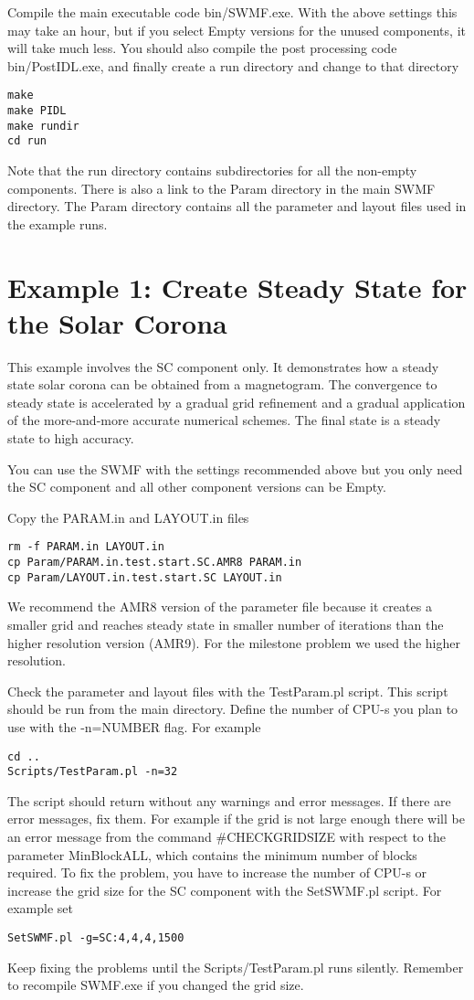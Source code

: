 Compile the main executable code bin/SWMF.exe. With the above
settings this may take an hour, but if you select Empty versions
for the unused components, it will take much less.
You should also compile the post processing code bin/PostIDL.exe,
and finally create a run directory and change to that directory
\begin{verbatim}
make
make PIDL
make rundir
cd run
\end{verbatim}
Note that the run directory contains subdirectories for all the
non-empty components. There is also a link to the Param directory
in the main SWMF directory. The Param directory contains all the
parameter and layout files used in the example runs.

\section{Example 1: Create Steady State for the Solar Corona}

This example involves the SC component only. It demonstrates
how a steady state solar corona can be obtained from
a magnetogram. The convergence to steady state is accelerated by 
a gradual grid refinement and a gradual application of the
more-and-more accurate numerical schemes. The final state
is a steady state to high accuracy. 

You can use the SWMF with the settings recommended above
but you only need the SC component and
all other component versions can be Empty.

Copy the PARAM.in and LAYOUT.in files
\begin{verbatim}
rm -f PARAM.in LAYOUT.in
cp Param/PARAM.in.test.start.SC.AMR8 PARAM.in
cp Param/LAYOUT.in.test.start.SC LAYOUT.in
\end{verbatim}
We recommend the AMR8 version of the parameter file because it creates
a smaller grid and reaches steady state in smaller number of iterations
than the higher resolution version (AMR9). For the milestone problem
we used the higher resolution.

Check the parameter and layout files with the TestParam.pl script. 
This script should be run from the main directory.
Define the number of CPU-s you plan to use with the -n=NUMBER flag.
For example
\begin{verbatim}
cd ..
Scripts/TestParam.pl -n=32
\end{verbatim}
The script should return without any warnings and error messages.
If there are error messages, fix them. 
For example if the grid is not large enough there will be an 
error message from the command \#CHECKGRIDSIZE with respect
to the parameter  MinBlockALL, which contains the minimum number
of blocks required. To fix the problem, you have to increase the number 
of CPU-s or increase the grid size for the SC component with the 
SetSWMF.pl script. For example set
\begin{verbatim}
SetSWMF.pl -g=SC:4,4,4,1500
\end{verbatim}
Keep fixing the problems until the Scripts/TestParam.pl runs silently.
Remember to recompile SWMF.exe if you changed the grid size.

